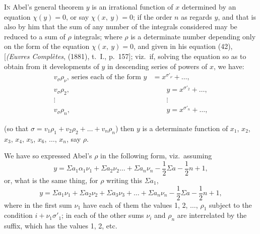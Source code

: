 \documentclass[12pt,a4paper,oneside]{book}
\theoremstyle{plain}
\theoremstyle{definition}
\theoremstyle{remark}
\begin{document}
\textsc{In} Abel's general theorem $y$ is an irrational function of $x$ determined by an equation $\chi(y)=0$, or say $\chi(x,\ y)=0$; if the order $n$ as regards $y$, and that is also by him that the sum of any number of the integrals considered may be reduced to a sum of $\rho$ integrals; where $\rho$ is a determinate number depending only on the form of the equation $\chi(x,\ y)=0$, and given in his equation (42), [\textit{(Euvres Compl\`etes}, (1881), t.~I., p.~157]; viz.\ if, solving the equation so as to obtain from it developments of $y$ in descending series of powers of $x$, we have:
\begin{align*}
v_\sigma\rho_\nu,\ \text{series each of the form } y&=x^{\sigma'_\nu}+\dots,\\
v_\sigma\rho_2,\ &\qquad y=x^{\sigma'_2}+\dots,\\
\vdots\qquad&\qquad\vdots\\
v_\sigma\rho_n,\ &\qquad y=x^{\sigma'_n}+\dots,
\end{align*}


\newpage
(so that $\sigma=v_1\rho_1+v_2\rho_2+\dots+v_n\rho_n$) then $y$ is a determinate function of $x_1$, $x_2$, $x_3$, $x_4$, $x_5$, $x_6$, $\dots$, $x_n$, say $\rho$.

We have so expressed Abel's $\rho$ in the following form, viz.\ assuming
\[
y=\Sigma a_1 \alpha_1 \nu_1+\Sigma a_2\nu_2\dots+\Sigma a_n\nu_n-\frac{1}{2}\Sigma a-\frac{1}{2}n+1,
\]
or, what is the same thing, for $\rho$ writing this $\Sigma a_1$,
\[
y=\Sigma a_1\nu_1+\Sigma a_2\nu_2+\Sigma a_3\nu_3+\dots+\Sigma a_n\nu_n-\frac{1}{2}\Sigma a-\frac{1}{2}n+1,
\]
where in the first sum $\nu_1$ have each of them the values 1, 2, $\dots$, $\rho_1$ subject to the condition $i+\nu_1\sigma'_1$; in each of the other sums $\nu_i$ and $\rho_n$ are interrelated by the suffix, which has the values 1, 2, etc.
\end{document}

